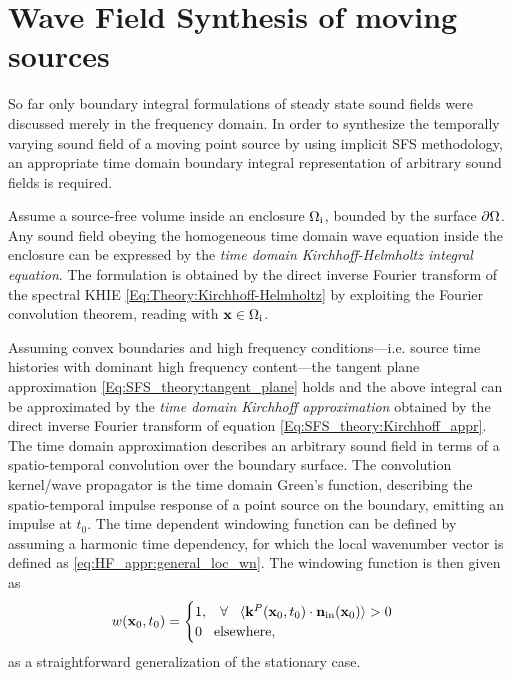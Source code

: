 \section{Wave Field Synthesis of moving sources}
\label{Sec:Moving_source_WFS}

So far only boundary integral formulations of steady state sound fields were discussed merely in the frequency domain.
In order to synthesize the temporally varying sound field of a moving point source by using implicit SFS methodology, an appropriate time domain boundary integral representation of arbitrary sound fields is required.

Assume a source-free volume inside an enclosure $\Omega_{\mathrm{i}}$, bounded by the surface $\partial \Omega$.
Any sound field obeying the homogeneous time domain wave equation inside the enclosure can be expressed by the \emph{time domain Kirchhoff-Helmholtz integral equation}.
The formulation is obtained by the direct inverse Fourier transform of the spectral KHIE \eqref{Eq:Theory:Kirchhoff-Helmholtz} by exploiting the Fourier convolution theorem, reading
with $\mathbf{x} \in \Omega_{\mathrm{i}}$.	

Assuming convex boundaries and high frequency conditions---i.e. source time histories with dominant high frequency content---the tangent plane approximation \eqref{Eq:SFS_theory:tangent_plane} holds and the above integral can be approximated by the \emph{time domain Kirchhoff approximation}
obtained by the direct inverse Fourier transform of equation \eqref{Eq:SFS_theory:Kirchhoff_appr}.
The time domain approximation describes an arbitrary sound field in terms of a spatio-temporal convolution over the boundary surface.
The convolution kernel/wave propagator is the time domain Green's function, describing the spatio-temporal impulse response of a point source on the boundary, emitting an impulse at $t_0$.
The time dependent windowing function can be defined by assuming a harmonic time dependency, for which the local wavenumber vector is defined as \eqref{eq:HF_appr:general_loc_wn}.
The windowing function is then given as
\begin{equation}
w(\mathbf{x}_0,t_0) = \begin{cases}
                        1, \hspace{3mm} \forall \hspace{3mm} \langle \mathbf{k}^P(\mathbf{x}_0,t_0) \cdot \mathbf{n}_{\mathrm{in}}(\mathbf{x}_0) \rangle > 0 \\
                        0  \hspace{3mm} \text{elsewhere},
                    \end{cases}
\label{eq:theory:windowing_function}
\end{equation}
as a straightforward generalization of the stationary case.

